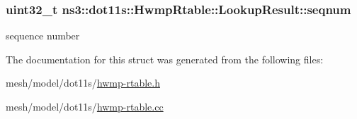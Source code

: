 \subsubsection[{\texorpdfstring{seqnum}{seqnum}}]{\setlength{\rightskip}{0pt plus 5cm}uint32\+\_\+t ns3\+::dot11s\+::\+Hwmp\+Rtable\+::\+Lookup\+Result\+::seqnum}\hypertarget{structns3_1_1dot11s_1_1HwmpRtable_1_1LookupResult_a670dbb3a25df320b19e5792e3c2027e1}{}\label{structns3_1_1dot11s_1_1HwmpRtable_1_1LookupResult_a670dbb3a25df320b19e5792e3c2027e1}


sequence number 



The documentation for this struct was generated from the following files\+:\begin{DoxyCompactItemize}
\item 
mesh/model/dot11s/\hyperlink{hwmp-rtable_8h}{hwmp-\/rtable.\+h}\item 
mesh/model/dot11s/\hyperlink{hwmp-rtable_8cc}{hwmp-\/rtable.\+cc}\end{DoxyCompactItemize}
